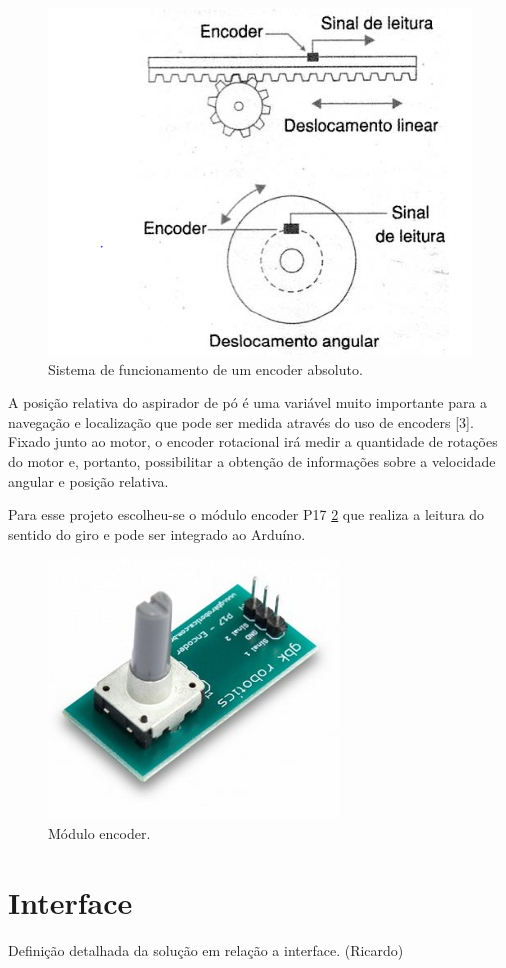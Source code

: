 \begin{enumerate}
					\begin{figure}[H]
						\centering
						\includegraphics[scale=0.6]{figuras/encoder.png}
						\caption{Sistema de funcionamento de um encoder absoluto.}
						\label{img:encoder}
					\end{figure}

					A posição relativa do aspirador de pó é uma variável muito importante para a navegação e localização que pode ser medida através do uso de encoders [3]. Fixado junto ao motor, o encoder rotacional irá medir a quantidade de rotações do motor e, portanto, possibilitar a obtenção de informações sobre a velocidade angular e posição relativa. 

					Para esse projeto escolheu-se o módulo encoder P17 \ref{img:modulo_encoder} que realiza a leitura do sentido do giro e pode ser integrado ao Arduíno.

					\begin{figure}[H]
						\centering
						\includegraphics[scale=0.6]{figuras/modulo_encoder.png}
						\caption{Módulo encoder.}
						\label{img:modulo_encoder}
					\end{figure}

			\end{enumerate}




\section{Interface} %
\label{sub:interface}
	Definição detalhada da solução em relação a interface. (Ricardo)
